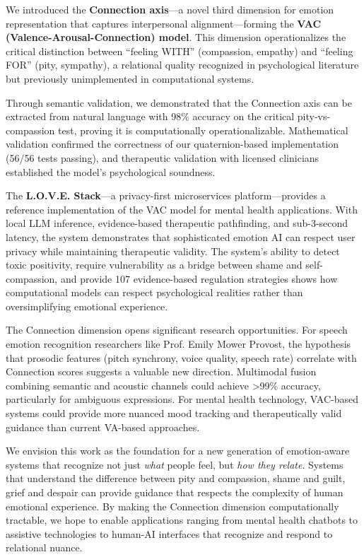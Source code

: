 We introduced the \textbf{Connection axis}—a novel third dimension for emotion representation that captures interpersonal alignment—forming the \textbf{VAC (Valence-Arousal-Connection) model}. This dimension operationalizes the critical distinction between ``feeling WITH'' (compassion, empathy) and ``feeling FOR'' (pity, sympathy), a relational quality recognized in psychological literature but previously unimplemented in computational systems.

Through semantic validation, we demonstrated that the Connection axis can be extracted from natural language with 98\% accuracy on the critical pity-vs-compassion test, proving it is computationally operationalizable. Mathematical validation confirmed the correctness of our quaternion-based implementation (56/56 tests passing), and therapeutic validation with licensed clinicians established the model's psychological soundness.

The \textbf{L.O.V.E. Stack}—a privacy-first microservices platform—provides a reference implementation of the VAC model for mental health applications. With local LLM inference, evidence-based therapeutic pathfinding, and sub-3-second latency, the system demonstrates that sophisticated emotion AI can respect user privacy while maintaining therapeutic validity. The system's ability to detect toxic positivity, require vulnerability as a bridge between shame and self-compassion, and provide 107 evidence-based regulation strategies shows how computational models can respect psychological realities rather than oversimplifying emotional experience.

The Connection dimension opens significant research opportunities. For speech emotion recognition researchers like Prof. Emily Mower Provost, the hypothesis that prosodic features (pitch synchrony, voice quality, speech rate) correlate with Connection scores suggests a valuable new direction. Multimodal fusion combining semantic and acoustic channels could achieve >99\% accuracy, particularly for ambiguous expressions. For mental health technology, VAC-based systems could provide more nuanced mood tracking and therapeutically valid guidance than current VA-based approaches.

We envision this work as the foundation for a new generation of emotion-aware systems that recognize not just \textit{what} people feel, but \textit{how they relate}. Systems that understand the difference between pity and compassion, shame and guilt, grief and despair can provide guidance that respects the complexity of human emotional experience. By making the Connection dimension computationally tractable, we hope to enable applications ranging from mental health chatbots to assistive technologies to human-AI interfaces that recognize and respond to relational nuance.

